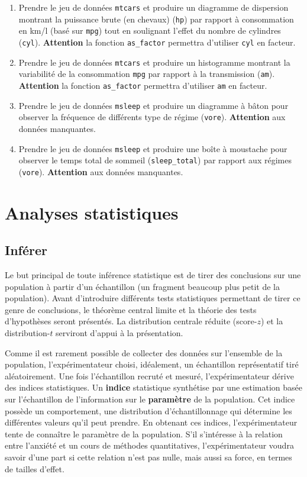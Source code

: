 \documentclass[
]{book}
\begin{document}
\begin{enumerate}
\def\labelenumi{\arabic{enumi}.}
\item
  Prendre le jeu de données \texttt{mtcars} et produire un diagramme de dispersion montrant la puissance brute (en chevaux) (\texttt{hp}) par rapport à consommation en km/l (basé sur \texttt{mpg}) tout en soulignant l'effet du nombre de cylindres (\texttt{cyl}). \textbf{Attention} la fonction \texttt{as\_factor} permettra d'utiliser \texttt{cyl} en facteur.
\item
  Prendre le jeu de données \texttt{mtcars} et produire un histogramme montrant la variabilité de la consommation \texttt{mpg} par rapport à la transmission (\texttt{am}). \textbf{Attention} la fonction \texttt{as\_factor} permettra d'utiliser \texttt{am} en facteur.
\item
  Prendre le jeu de données \texttt{msleep} et produire un diagramme à bâton pour observer la fréquence de différents type de régime (\texttt{vore}). \textbf{Attention} aux données manquantes.
\item
  Prendre le jeu de données \texttt{msleep} et produire une boîte à moustache pour observer le temps total de sommeil (\texttt{sleep\_total}) par rapport aux régimes (\texttt{vore}). \textbf{Attention} aux données manquantes.
\end{enumerate}

\hypertarget{part-analyses-statistiques}{%
\part{Analyses statistiques}\label{part-analyses-statistiques}}

\hypertarget{infuxe9rer}{%
\chapter{Inférer}\label{infuxe9rer}}

Le but principal de toute inférence statistique est de tirer des conclusions sur une population à partir d'un échantillon (un fragment beaucoup plus petit de la population). Avant d'introduire différents tests statistiques permettant de tirer ce genre de conclusions, le théorème central limite et la théorie des tests d'hypothèses seront présentés. La distribution centrale réduite (score-\(z\)) et la distribution-\(t\) serviront d'appui à la présentation.

Comme il est rarement possible de collecter des données sur l'ensemble de la population, l'expérimentateur choisi, idéalement, un échantillon représentatif tiré aléatoirement. Une fois l'échantillon recruté et mesuré, l'expérimentateur dérive des indices statistiques. Un \textbf{indice} statistique synthétise par une estimation basée sur l'échantillon de l'information sur le \textbf{paramètre} de la population. Cet indice possède un comportement, une distribution d'échantillonnage qui détermine les différentes valeurs qu'il peut prendre. En obtenant ces indices, l'expérimentateur tente de connaître le paramètre de la population. S'il s'intéresse à la relation entre l'anxiété et un cours de méthodes quantitatives, l'expérimentateur voudra savoir d'une part si cette relation n'est pas nulle, mais aussi sa force, en termes de tailles d'effet.
\end{document}
